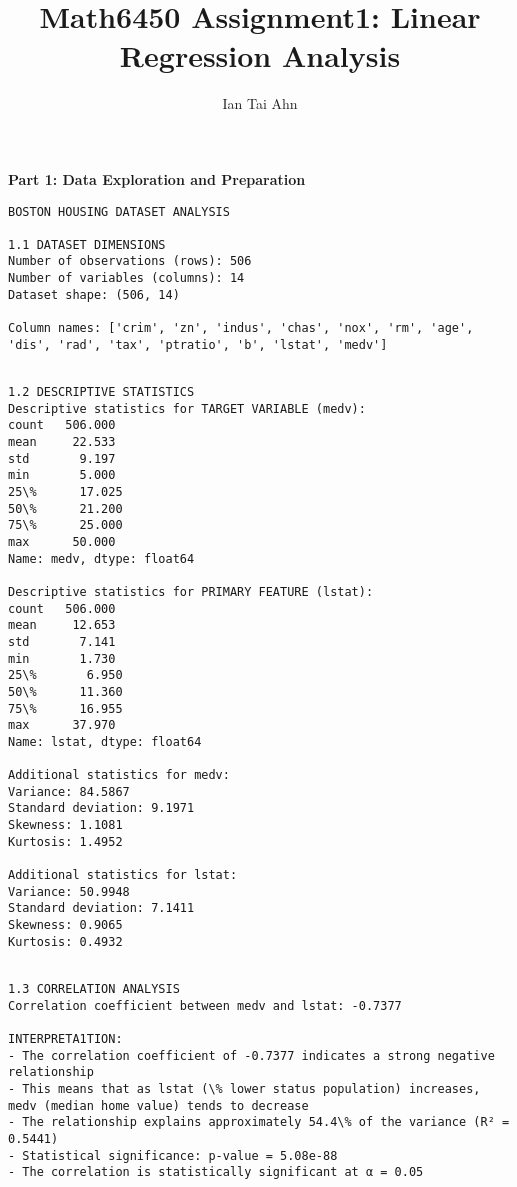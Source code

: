 \documentclass[8pt, twocolumn]{extarticle}
\title{Math6450 Assignment1: Linear Regression Analysis}
\author{Ian Tai Ahn}
\begin{document}
\fontsize{8.5pt}{8pt}\selectfont
    \maketitle
    
    
    \textbf{Part 1: Data Exploration and Preparation}
    \begin{Verbatim}[commandchars=\\\{\}]
BOSTON HOUSING DATASET ANALYSIS

1.1 DATASET DIMENSIONS
Number of observations (rows): 506
Number of variables (columns): 14
Dataset shape: (506, 14)

Column names: ['crim', 'zn', 'indus', 'chas', 'nox', 'rm', 'age', 'dis', 'rad', 'tax', 'ptratio', 'b', 'lstat', 'medv']
    \end{Verbatim}

    \begin{Verbatim}[commandchars=\\\{\}]

1.2 DESCRIPTIVE STATISTICS
Descriptive statistics for TARGET VARIABLE (medv):
count   506.000
mean     22.533
std       9.197
min       5.000
25\%      17.025
50\%      21.200
75\%      25.000
max      50.000
Name: medv, dtype: float64

Descriptive statistics for PRIMARY FEATURE (lstat):
count   506.000
mean     12.653
std       7.141
min       1.730
25\%       6.950
50\%      11.360
75\%      16.955
max      37.970
Name: lstat, dtype: float64

Additional statistics for medv:
Variance: 84.5867
Standard deviation: 9.1971
Skewness: 1.1081
Kurtosis: 1.4952

Additional statistics for lstat:
Variance: 50.9948
Standard deviation: 7.1411
Skewness: 0.9065
Kurtosis: 0.4932
    \end{Verbatim}

    \begin{Verbatim}[commandchars=\\\{\}]

1.3 CORRELATION ANALYSIS
Correlation coefficient between medv and lstat: -0.7377

INTERPRETA1TION:
- The correlation coefficient of -0.7377 indicates a strong negative relationship
- This means that as lstat (\% lower status population) increases, medv (median home value) tends to decrease
- The relationship explains approximately 54.4\% of the variance (R² = 0.5441)
- Statistical significance: p-value = 5.08e-88
- The correlation is statistically significant at α = 0.05
    \end{Verbatim}
\end{document}
